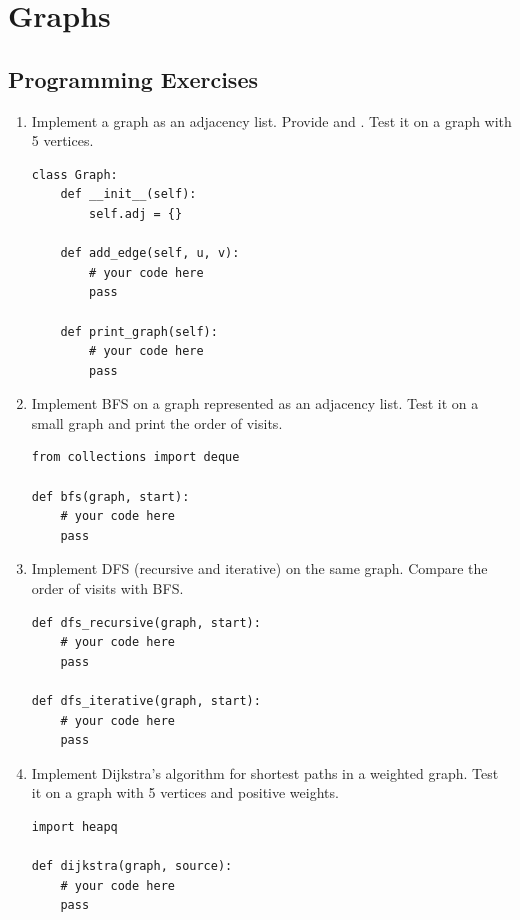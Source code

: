 \documentclass[11pt,a4paper]{article}
\newcommand{\code}[1]{\texttt{\detokenize{#1}}}
\newcommand{\medium}{$\star\star$}
\newcommand{\hard}{$\star\star\star$}
\begin{document}
\section{Graphs}

\subsection{Programming Exercises}

\begin{enumerate}[label=\textbf{7.\arabic*}]

    \item[\medium] Implement a graph as an adjacency list. Provide \code{add_edge(u, v)} and \code{print_graph()}. Test it on a graph with 5 vertices.
    \begin{lstlisting}
class Graph:
    def __init__(self):
        self.adj = {}

    def add_edge(self, u, v):
        # your code here
        pass

    def print_graph(self):
        # your code here
        pass
    \end{lstlisting}

    \item[\medium] Implement BFS on a graph represented as an adjacency list. Test it on a small graph and print the order of visits.
    \begin{lstlisting}
from collections import deque

def bfs(graph, start):
    # your code here
    pass
    \end{lstlisting}

    \item[\medium] Implement DFS (recursive and iterative) on the same graph. Compare the order of visits with BFS.
    \begin{lstlisting}
def dfs_recursive(graph, start):
    # your code here
    pass

def dfs_iterative(graph, start):
    # your code here
    pass
    \end{lstlisting}

    \item[\hard] Implement Dijkstra's algorithm for shortest paths in a weighted graph. Test it on a graph with 5 vertices and positive weights.
    \begin{lstlisting}
import heapq

def dijkstra(graph, source):
    # your code here
    pass
    \end{lstlisting}

\end{enumerate}
\end{document}

